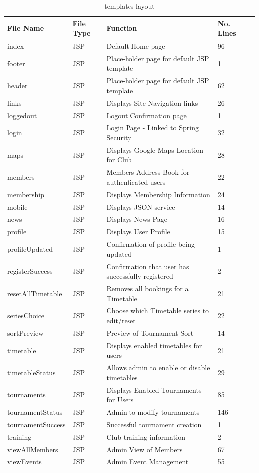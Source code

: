 \begin{table}[H]
\begin{center}
    \begin{tabular}{| l | l | l| l |p{1cm} |}
    \hline
    File Name & File Type & Function & No. Lines\\ \hline
	index & JSP & Default Home page & 96\\ \hline
	footer & JSP & Place-holder page for default JSP template & 1\\ \hline	
	header & JSP & Place-holder page for default JSP template & 62\\ \hline		
	links & JSP & Displays Site Navigation links & 26\\ \hline	
	loggedout & JSP & Logout Confirmation page & 1\\ \hline	
	login & JSP & Login Page - Linked to Spring Security & 32\\ \hline	
	maps & JSP & Displays Google Maps Location for Club & 28\\ \hline	
	members & JSP & Members Address Book for authenticated users & 22\\ \hline	
	membership & JSP & Displays Membership Information & 24\\ \hline	
	mobile & JSP & Displays JSON service & 14\\ \hline
	news & JSP & Displays News Page & 16\\ \hline	
	profile & JSP & Displays User Profile & 15\\ \hline	
	profileUpdated & JSP & Confirmation of profile being updated & 1\\ \hline	
	registerSuccess & JSP & Confirmation that user has successfully registered & 2\\ \hline	
	resetAllTimetable & JSP & Removes all bookings for a Timetable & 21\\ \hline	
	seriesChoice & JSP & Choose which Timetable series to edit/reset & 22\\ \hline	
	sortPreview & JSP & Preview of Tournament Sort & 14\\ \hline	
	timetable & JSP & Displays enabled timetables for users & 21 \\ \hline	
	timetableStatus & JSP & Allows admin to enable or disable timetables & 29\\ \hline	
	tournaments & JSP & Displays Enabled Tournaments for Users & 85\\ \hline	
	tournamentStatus & JSP & Admin to modify tournaments & 146\\ \hline	
	tournamentSuccess & JSP & Successful tournament creation & 1\\ \hline	
	training & JSP & Club training information & 2\\ \hline
	viewAllMembers & JSP & Admin View of Members & 67\\ \hline	
	viewEvents & JSP & Admin Event Management & 55\\ \hline	
    \end{tabular}
\end{center}
\caption{templates layout}
\end{table}

